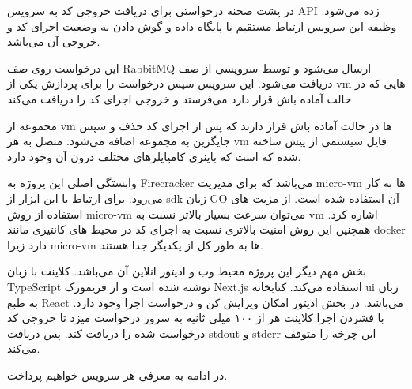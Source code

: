 در پشت صحنه درخواستی برای دریافت خروجی کد به سرویس API زده می‌شود. وظیفه این سرویس ارتباط مستقیم با پایگاه داده و گوش دادن به وضعیت اجرای کد و خروجی آن می‌باشد.


این درخواست روی صف RabbitMQ ارسال می‌شود و توسط سرویسی از صف دریافت می‌شود.
این سرویس سپس درخواست را برای پردازش یکی از vm هایی که در حالت آماده باش قرار دارد می‌فرستد و خروجی اجرای کد را دریافت می‌کند.

مجموعه از vm ها در حالت آماده باش قرار دارند که پس از اجرای کد حذف و سپس جایگزین به مجموعه اضافه می‌شود.
متصل به هر vm فایل سیستمی از پیش ساخته شده که است که باینری کامپایلرهای مختلف درون آن وجود دارد.


وابستگی اصلی این پروژه به Firecracker می‌باشد که برای مدیریت micro-vm ها به کار می‌رود.
برای ارتباط با این ابزار از sdk زبان GO آن استفاده شده است.
از مزیت های استفاده از روش micro-vm می‌توان سرعت بسیار بالاتر نسبت به vm اشاره کرد.
همچنین این روش امنیت بالاتری نسبت به اجرای کد در محیط های کانتیری مانند docker دارد زیرا micro-vm ها به طور کل از یکدیگر جدا هستند.

بخش مهم دیگر این پروژه محیط وب و ادیتور انلاین آن می‌باشد. کلاینت با زبان TypeScript نوشته شده است و از فریمورک Next.js استفاده می‌کند.
کتابخانه ui زبان به طبع React می‌باشد.
در بخش ادیتور امکان ویرایش کن و درخواست اجرا وجود دارد. با فشردن اجرا کلاینت هر از ۱۰۰ میلی ثانیه به سرور درخواست میزد تا خروجی کد درخواست شده را دریافت کند. پس دریافت stdout و stderr این چرخه را متوقف می‌کند.

در ادامه به معرفی هر سرویس خواهیم پرداخت.